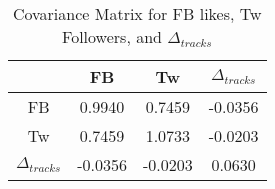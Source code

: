 \documentclass[conference]{IEEEtran}
\begin{document}
\begin{table}[!t]
\renewcommand{\arraystretch}{1.3}
\caption{Covariance Matrix for FB likes, Tw Followers, and $\Delta_{tracks}$}
\label{covariance_1}
\centering
\begin{tabular}{c|ccc}
 & FB & Tw & $\Delta_{tracks}$\\
\hline
FB & 0.9940 & 0.7459 & -0.0356\\
Tw & 0.7459 & 1.0733 & -0.0203\\
$\Delta_{tracks}$ & -0.0356 & -0.0203 & 0.0630
\end{tabular}
\end{table}


%
%



%
%
\end{document}
